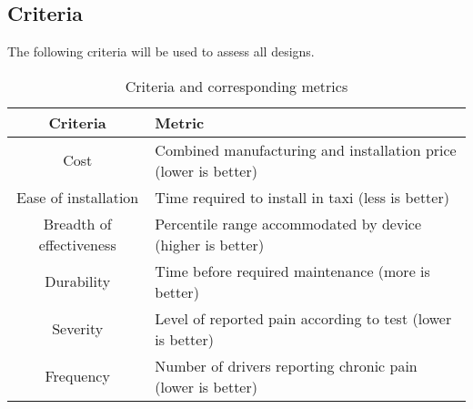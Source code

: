 \documentclass[11pt]{article}
\begin{document}
\subsection{Criteria}
The following criteria will be used to assess all designs.
\begin{table}[h]
\centering
\caption{Criteria and corresponding metrics}
\begin{tabular}{c p{10cm} }
  Criteria & Metric \\ \hline
  Cost & Combined manufacturing and installation price (lower is better) \\
  Ease of installation & Time required to install in taxi (less is better) \\
  Breadth of effectiveness & Percentile range accommodated by device (higher is better) \\
  Durability & Time before required maintenance (more is better) \\
  Severity & Level of reported pain according to test (lower is better) \\
  Frequency & Number of drivers reporting chronic pain (lower is better)
\end{tabular}
\end{table}



\end{document}
